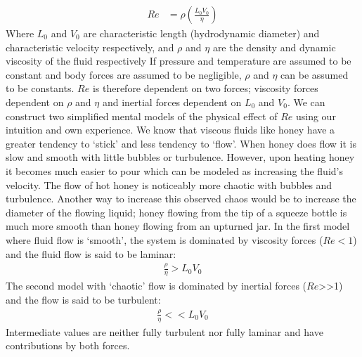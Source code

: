 \documentclass[titlepage]{article}
\begin{document}
\begin{align*}
    Re &= \rho\left(\displaystyle\frac{L_{0}V_{0}}{\eta}\right)
\end{align*}
\indent  Where $L_{0}$ and $V_{0}$ are characteristic length (hydrodynamic diameter) and characteristic velocity respectively, and $\rho$ and $\eta$ are the density and dynamic viscosity of the fluid respectively If pressure and temperature are assumed to be constant and body forces are assumed to be negligible, $\rho$ and $\eta$ can be assumed to be constants. $Re$ is therefore dependent on two forces; viscosity forces dependent on $\rho$ and $\eta$ and inertial forces dependent on $L_{0}$ and $V_{0}$. \newline
\indent We can construct two simplified mental models of the physical effect of $Re$ using our intuition and own experience. We know that viscous fluids like honey have a greater tendency to `stick' and less tendency to `flow'. When honey does flow it is slow and smooth with little bubbles or turbulence. However, upon heating honey it becomes much easier to pour which can be modeled as increasing the fluid's velocity. The flow of hot honey is noticeably more chaotic with bubbles and turbulence. Another way to increase this observed chaos would be to increase the diameter of the flowing liquid; honey flowing from the tip of a squeeze bottle is much more smooth than honey flowing from an upturned jar. \newline 
\indent In the first model where fluid flow is `smooth', the system is dominated by viscosity forces ($Re < 1$) and the fluid flow is said to be laminar:
\begin{align}
    \displaystyle\frac{\rho}{\eta} > L_{0}V_{0}
\end{align}
\indent The second model with `chaotic' flow is dominated by inertial forces ($Re$>{}>1) and the flow is said to be turbulent: 
\begin{align}
    \displaystyle\frac{\rho}{\eta} << L_{0}V_{0}
\end{align}
\indent Intermediate values are neither fully turbulent nor fully laminar and have contributions by both forces. 

\newpage
\end{document}
